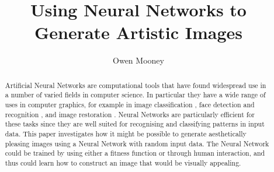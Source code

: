 \documentclass{acm_proc_article-sp}
\begin{document}

\title{Using Neural Networks to Generate Artistic Images}
\author{Owen Mooney}

\maketitle

\begin{abstract}
Artificial Neural Networks are computational tools that have found widespread use in a number of varied fields in computer science. In particular they have a wide range of uses in computer graphics, for example in image classification \cite{Zhang:1992:ANN:503720.503776}, face detection \cite{Lee:2002:EAF:646864.708276} and recognition \cite{Zhao:2003:FRL:954339.954342}, and image restoration \cite{deCastro:2008:RIM:1363686.1364088}. Neural Networks are particularly efficient for these tasks since they are well suited for recognising and classifying patterns in input data. This paper investigates how it might be possible to generate aesthetically pleasing images using a Neural Network with random input data. The Neural Network could be trained by using either a fitness function or through human interaction, and thus could learn how to construct an image that would be visually appealing.
\end{abstract}
\end{document}
